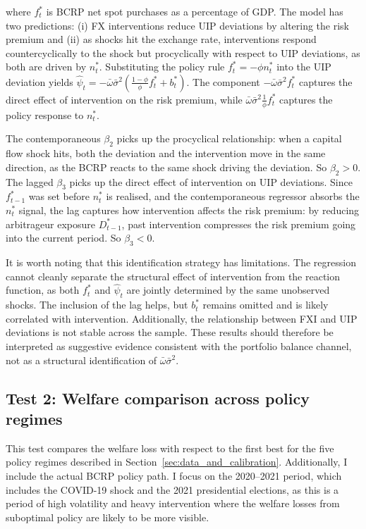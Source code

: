 \documentclass[12pt,a4paper]{article}
\begin{document}
where $f^*_{t}$ is BCRP net spot purchases as a percentage of GDP. The model has two predictions: (i) FX interventions reduce UIP deviations by altering the risk premium and (ii) as shocks hit the exchange rate, interventions respond countercyclically to the shock but procyclically with respect to UIP deviations, as both are driven by $n^*_t$. Substituting the policy rule $f^*_t = -\phi n^*_t$ into the UIP deviation yields $\hat{\psi}_t = -\bar{\omega}\bar{\sigma}^2\left(\frac{1-\phi}{\phi}f^*_t + b^*_t\right)$. The component $-\bar{\omega}\bar{\sigma}^2 f^*_t$ captures the direct effect of intervention on the risk premium, while $\bar{\omega}\bar{\sigma}^2\frac{1}{\phi}f^*_t$ captures the policy response to $n^*_t$.

The contemporaneous $\beta_2$ picks up the procyclical relationship: when a capital flow shock hits, both the deviation and the intervention move in the same direction, as the BCRP reacts to the same shock driving the deviation. So $\beta_2 > 0$. The lagged $\beta_3$ picks up the direct effect of intervention on UIP deviations. Since $f^*_{t-1}$ was set before $n^*_t$ is realised, and the contemporaneous regressor absorbs the $n^*_t$ signal, the lag captures how intervention affects the risk premium: by reducing arbitrageur exposure $D^*_{t-1}$, past intervention compresses the risk premium going into the current period. So $\beta_3 < 0$.

It is worth noting that this identification strategy has limitations. The regression cannot cleanly separate the structural effect of intervention from the reaction function, as both $f^*_t$ and $\hat{\psi}_t$ are jointly determined by the same unobserved shocks. The inclusion of the lag helps, but $b^*_t$ remains omitted and is likely correlated with intervention. Additionally, the relationship between FXI and UIP deviations is not stable across the sample. These results should therefore be interpreted as suggestive evidence consistent with the portfolio balance channel, not as a structural identification of $\bar{\omega}\bar{\sigma}^2$.

\subsection{Test 2: Welfare comparison across policy regimes}

This test compares the welfare loss with respect to the first best for the five policy regimes described in Section~\ref{sec:data_and_calibration}. Additionally, I include the actual BCRP policy path. I focus on the 2020--2021 period, which includes the COVID-19 shock and the 2021 presidential elections, as this is a period of high volatility and heavy intervention where the welfare losses from suboptimal policy are likely to be more visible. 
\end{document}
